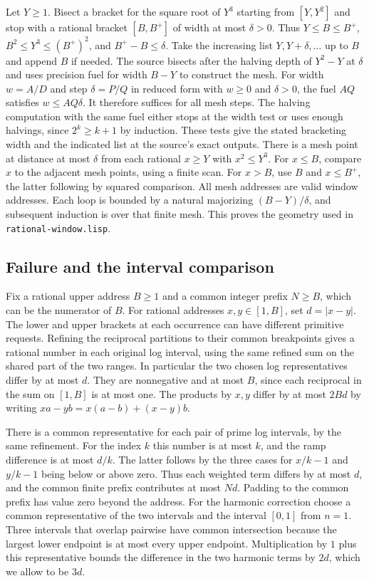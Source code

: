 \documentclass[11pt]{amsart}
\theoremstyle{definition}
\theoremstyle{remark}
\numberwithin{equation}{section}
\newcommand{\code}[1]{\nolinkurl{#1}}
\begin{document}
Let $Y\ge1$. Bisect a bracket for the square root of $Y^3$ starting
from $[Y,Y^2]$ and stop with a rational bracket $[B,B^+]$ of
width at most $\delta>0$. Thus $Y\le B\le B^+$,
$B^2\le Y^3\le(B^+)^2$, and $B^+-B\le\delta$.
Take the increasing list $Y,Y+\delta,\ldots$ up to $B$ and
append $B$ if needed. The source bisects after the halving depth of
$Y^2-Y$ at $\delta$ and uses precision fuel for width $B-Y$ to
construct the mesh. For width $w=A/D$ and step
$\delta=P/Q$ in reduced form with $w\ge0$ and $\delta>0$,
the fuel $AQ$ satisfies $w\le AQ\delta$. It therefore
suffices for all mesh steps. The halving computation with the same
fuel either stops at the width test or uses enough halvings, since
$2^k\ge k+1$ by induction. These tests give the stated bracketing
width and the indicated list at the source's exact outputs.
There is a mesh point at distance at most
$\delta$ from each rational $x\ge Y$ with $x^2\le Y^3$.
For $x\le B$, compare $x$ to the adjacent mesh points, using a
finite scan. For $x>B$, use $B$ and $x\le B^+$, the latter
following by squared comparison. All mesh addresses are valid
window addresses. Each loop is bounded by a natural majorizing
$(B-Y)/\delta$, and subsequent induction is over that finite mesh.
This proves the geometry used in \code{rational-window.lisp}.

\subsection{Failure and the interval comparison}

Fix a rational upper address $B\ge1$ and a common integer
prefix $N\ge B$, which can be the numerator of $B$. For rational
addresses $x,y\in[1,B]$, set $d=|x-y|$.
The lower and upper brackets at each occurrence can have different
primitive requests. Refining the reciprocal partitions to their common
breakpoints gives a rational number in each original log interval,
using the same refined sum on the shared part of the two ranges.
In particular the two chosen log representatives differ by at most
$d$. They are nonnegative and at most $B$, since each reciprocal in
the sum on $[1,B]$ is at most one. The products by $x,y$ differ
by at most $2Bd$ by writing $xa-yb=x(a-b)+(x-y)b$.

There is a common representative for each pair of prime log
intervals, by the same refinement. For the index $k$ this number
is at most $k$, and the ramp difference is at most $d/k$.
The latter follows by the three cases for $x/k-1$ and $y/k-1$
being below or above zero. Thus each weighted term differs by
at most $d$, and the common finite prefix contributes at most
$Nd$. Padding to the common prefix has value zero beyond the
address. For the harmonic correction choose a common representative
of the two intervals and the interval $[0,1]$ from $n=1$.
Three intervals that overlap pairwise have common intersection
because the largest lower endpoint is at most every upper endpoint.
Multiplication by $1$ plus this representative bounds the difference
in the two harmonic terms by $2d$, which we allow to be $3d$.
\end{document}
